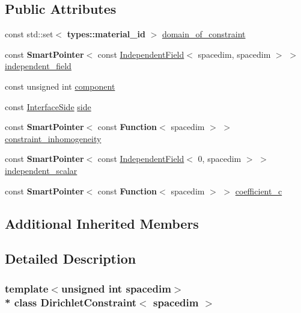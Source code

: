 \subsection*{Public Attributes}
\begin{DoxyCompactItemize}
\item 
const std\+::set$<$ {\bf types\+::material\+\_\+id} $>$ \hyperlink{class_dirichlet_constraint_a258b6ff11b206f966bb03943bb11f469}{domain\+\_\+of\+\_\+constraint}
\item 
const {\bf Smart\+Pointer}$<$ const \hyperlink{class_independent_field}{Independent\+Field}$<$ spacedim, spacedim $>$ $>$ \hyperlink{class_dirichlet_constraint_abbd7945a973ed93d1d773307393ffde3}{independent\+\_\+field}
\item 
const unsigned int \hyperlink{class_dirichlet_constraint_a7e3c4d0e0906af1c81b88e05e41bdafc}{component}
\item 
const \hyperlink{triangulation__system_8h_a44f3c00e36c1d6e3c389ae693c09b435}{Interface\+Side} \hyperlink{class_dirichlet_constraint_ae049d107664d3bf23d287ec77545b6f3}{side}
\item 
const {\bf Smart\+Pointer}$<$ const {\bf Function}$<$ spacedim $>$ $>$ \hyperlink{class_dirichlet_constraint_af22d2bca23999bdb4f2b67e8982d29c5}{constraint\+\_\+inhomogeneity}
\item 
const {\bf Smart\+Pointer}$<$ const \hyperlink{class_independent_field}{Independent\+Field}$<$ 0, spacedim $>$ $>$ \hyperlink{class_dirichlet_constraint_a8793f0d41a9c6e88638d7cf5d52a6fdd}{independent\+\_\+scalar}
\item 
const {\bf Smart\+Pointer}$<$ const {\bf Function}$<$ spacedim $>$ $>$ \hyperlink{class_dirichlet_constraint_adea2dc6126a633b297eb7dfce832b9ef}{coefficient\+\_\+c}
\end{DoxyCompactItemize}
\subsection*{Additional Inherited Members}


\subsection{Detailed Description}
\subsubsection*{template$<$unsigned int spacedim$>$\\*
class Dirichlet\+Constraint$<$ spacedim $>$}

